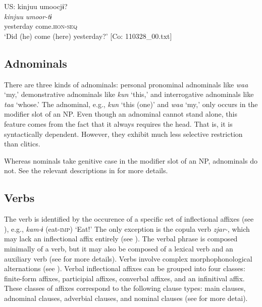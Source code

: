 \ea{} \label{ex:4.48}
US: \glll   kinjuu  umoocjɨ?\\
    \textit{kinjuu}  \textit{umoor-tɨ}\\
    yesterday  come.\textsc{hon}-\textsc{seq}\\
  \glt     ‘Did (he) come (here) yesterday?’ [Co: 110328\_00.txt]
\z

\subsection{Adnominals}\label{sec:4.3.2}

There are three kinds of adnominals: personal pronominal adnominals like \textit{waa} ‘my,’ demonstrative adnominals like \textit{kun} ‘this,’ and interrogative adnominals like \textit{taa} ‘whose.’ The adnominal, e.g., \textit{kun} ‘this (one)’ and \textit{waa} ‘my,’ only occurs in the modifier slot of an NP. Even though an adnominal cannot stand alone, this feature comes from the fact that it always requires the head. That is, it is syntactically dependent. However, they exhibit much less selective restriction than clitics. 

Whereas nominals take genitive case in the modifier slot of an NP, adnominals do not. See the relevant descriptions in  for more details.

\subsection{Verbs}\label{sec:4.3.3}

The verb is identified by the occurence of a specific set of inflectional affixes (see ), e.g., \textit{kam-ɨ} (eat-\textsc{imp}) ‘Eat!’ The only exception is the copula verb \textit{zjar-}, which may lack an inflectional affix entirely (see ). The verbal phrase is composed minimally of a verb, but it may also be composed of a lexical verb and an auxiliary verb (see  for more details). Verbs involve complex morphophonological alternations (see ). Verbal inflectional affixes can be grouped into four classes: finite-form affixes, participial affixes, converbal affixes, and an infinitival affix. These classes of affixes correspond to the following clause types: main clauses, adnominal clauses, adverbial clauses, and nominal clauses (see  for more detai).

